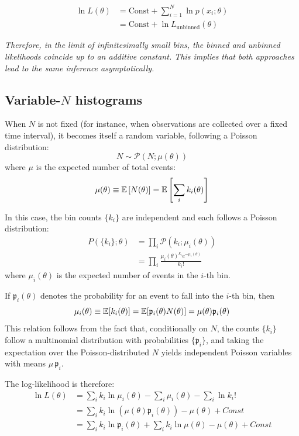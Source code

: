 \begin{align*}
	\ln L(\theta) &= \text{Const} + \sum_{i=1}^{N}\ln p(x_i;\theta)\\
	&= \text{Const} + \ln L_{\text{unbinned}}(\theta) 
\end{align*}

\emph{Therefore, in the limit of infinitesimally small bins, the binned and unbinned likelihoods coincide up to an additive constant. This implies that both approaches lead to the same inference asymptotically.}

\subsection{Variable-$N$ histograms}
\label{subsec:variable_N_hist}

When $N$ is not fixed (for instance, when observations are collected over a fixed time interval), it becomes itself a random variable, following a Poisson distribution:
\[
	N \sim \mathcal{P}(N; \mu(\theta))
\]
where $\mu$ is the expected number of total events:
\[
	\mu(\theta)\equiv\mathbb{E}\left[N(\theta)\right]=\mathbb{E}\left[\sum_i k_i(\theta)\right]
\]

In this case, the bin counts $\{k_i\}$ are independent and each follows a Poisson distribution:
\begin{align*}
	P(\{k_i\};\theta)&=\prod_i\mathcal{P}(k_i;\mu_i(\theta))\\
	&=\prod_i \frac{\mu_i(\theta)^{k_i}e^{-\mu_i(\theta)}}{k_i!}
\end{align*}
where $\mu_i(\theta)$ is the expected number of events in the $i$-th bin.

If $\mathfrak{p}_i(\theta)$ denotes the probability for an event to fall into the $i$-th bin, then
\[
	\mu_i (\theta) \equiv \mathbb{E} [ k_i (\theta) ] = \mathbb{E} [\mathfrak{p}_i(\theta)N(\theta)] = \mu(\theta)\mathfrak{p}_i(\theta)
\]
This relation follows from the fact that, conditionally on $N$, the counts $\{k_i\}$ follow a multinomial distribution with probabilities $\{\mathfrak{p}_i\}$, and taking the expectation over the Poisson-distributed $N$ yields independent Poisson variables with means $\mu\,\mathfrak{p}_i$.

The log-likelihood is therefore:
\begin{align*}
	\ln L(\theta)&=\sum_i k_i \ln \mu_i(\theta)-\sum_i \mu_i(\theta)-\sum_i \ln k_i!\\
	&=\sum_ik_i\ln (\mu (\theta) \mathfrak{p}_i(\theta))-\mu(\theta) + Const\\
	&=\sum_i k_i \ln \mathfrak{p}_i(\theta) + \sum_i k_i \ln \mu (\theta) -\mu(\theta) + Const
\end{align*}

